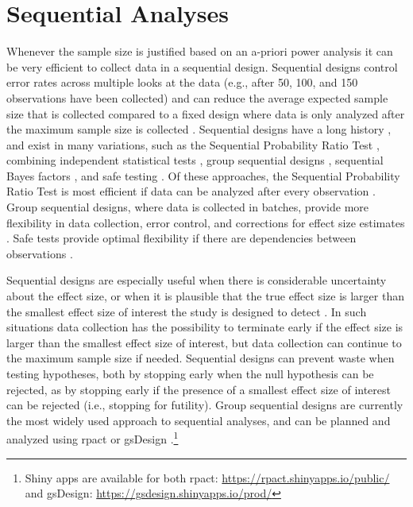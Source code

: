 \documentclass[
]{krantz}
\begin{document}
\hypertarget{sequential-analyses}{%
\section{Sequential Analyses}\label{sequential-analyses}}

Whenever the sample size is justified based on an a-priori power analysis it can be very efficient to collect data in a sequential design. Sequential designs control error rates across multiple looks at the data (e.g., after 50, 100, and 150 observations have been collected) and can reduce the average expected sample size that is collected compared to a fixed design where data is only analyzed after the maximum sample size is collected \citep{wassmer_group_2016, proschan_statistical_2006}. Sequential designs have a long history \citep{dodge_method_1929}, and exist in many variations, such as the Sequential Probability Ratio Test \citep{wald_sequential_1945}, combining independent statistical tests \citep{westberg_combining_1985}, group sequential designs \citep{jennison_group_2000}, sequential Bayes factors \citep{schonbrodt_sequential_2017}, and safe testing \citep{grunwald_safe_2019}. Of these approaches, the Sequential Probability Ratio Test is most efficient if data can be analyzed after every observation \citep{schnuerch_controlling_2020}. Group sequential designs, where data is collected in batches, provide more flexibility in data collection, error control, and corrections for effect size estimates \citep{wassmer_group_2016}. Safe tests provide optimal flexibility if there are dependencies between observations \citep{ter_schure_accumulation_2019}.

Sequential designs are especially useful when there is considerable uncertainty about the effect size, or when it is plausible that the true effect size is larger than the smallest effect size of interest the study is designed to detect \citep{lakens_performing_2014}. In such situations data collection has the possibility to terminate early if the effect size is larger than the smallest effect size of interest, but data collection can continue to the maximum sample size if needed. Sequential designs can prevent waste when testing hypotheses, both by stopping early when the null hypothesis can be rejected, as by stopping early if the presence of a smallest effect size of interest can be rejected (i.e., stopping for futility). Group sequential designs are currently the most widely used approach to sequential analyses, and can be planned and analyzed using rpact \citep{wassmer_rpact_2019} or gsDesign \citep{anderson_group_2014}.\footnote{Shiny apps are available for both rpact: \url{https://rpact.shinyapps.io/public/} and gsDesign: \url{https://gsdesign.shinyapps.io/prod/}}
\end{document}
